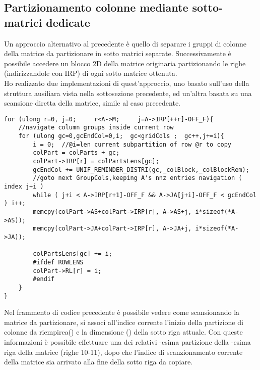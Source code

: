 \subsection{Partizionamento colonne mediante sotto-matrici dedicate} \label{chSpMMAux:csrColPartitioningAllocatd}
Un approccio alternativo al precedente è quello di separare i gruppi di colonne della matrice da 
partizionare in sotto matrici separate.
Successivamente è possibile accedere un blocco 2D della matrice originaria partizionando 
le righe (indirizzandole con IRP) di ogni sotto matrice ottenuta.\\
Ho realizzato due implementazioni di quest'approccio,
uno basato sull'uso della struttura ausiliara vista nella sottosezione precedente, 
ed un'altra basata su una scansione diretta della matrice, simile al caso precedente.\\ 

\begin{lstlisting}
for (ulong r=0, j=0;     r<A->M;     j=A->IRP[++r]-OFF_F){
    //navigate column groups inside current row
    for (ulong gc=0,gcEndCol=0,i;  gc<gridCols ;  gc++,j+=i){
        i = 0;  //@i=len current subpartition of row @r to copy
        colPart = colParts + gc;
        colPart->IRP[r] = colPartsLens[gc];	
        gcEndCol += UNIF_REMINDER_DISTRI(gc,_colBlock,_colBlockRem);
        //goto next GroupCols,keeping A's nnz entries navigation ( index j+i )
        while ( j+i < A->IRP[r+1]-OFF_F && A->JA[j+i]-OFF_F < gcEndCol ) i++;
        memcpy(colPart->AS+colPart->IRP[r], A->AS+j, i*sizeof(*A->AS));
        memcpy(colPart->JA+colPart->IRP[r], A->JA+j, i*sizeof(*A->JA));
        
        colPartsLens[gc] += i;
		#ifdef ROWLENS
        colPart->RL[r] = i;
		#endif
    }
}
\end{lstlisting}
Nel frammento di codice precedente è possibile vedere come scansionando la matrice da partizionare,
si associ all'indice corrente l'inizio della partizione di colonne da riempirea()
e la dimensione () della sotto riga attuale.%
Con queste informazioni è possibile effettuare una  dei \nnz relativi 
-esima partizione della -esima riga della matrice (righe 10-11),
dopo che l'indice di scanzionamento corrente della matrice  sia arrivato alla 
fine della sotto riga da copiare.\\

